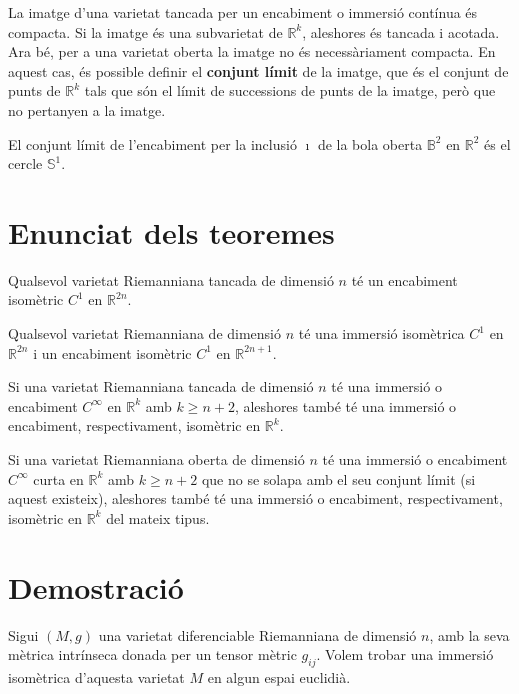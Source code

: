 La imatge d'una varietat tancada per un encabiment o immersió contínua és compacta. Si la imatge és una subvarietat de $\mathbb R^k$, aleshores és tancada i acotada. Ara bé, per a una varietat oberta la imatge no és necessàriament compacta. En aquest cas, és possible definir el \textbf{conjunt límit} de la imatge, que és el conjunt de punts de $\mathbb R^k$ tals que són el límit de successions de punts de la imatge, però que no pertanyen a la imatge. 

\begin{ex}
    El conjunt límit de l'encabiment per la inclusió $\imath$ de la bola oberta $\mathbb B^2$ en $\mathbb R^2$ és el cercle $\mathbb S^1$.
\end{ex}

\section{Enunciat dels teoremes}

\begin{teo}
    Qualsevol varietat Riemanniana tancada de dimensió $n$ té un encabiment isomètric $C^1$ en $\mathbb R^{2n}$.
\end{teo}
\begin{teo}
    Qualsevol varietat Riemanniana de dimensió $n$ té una immersió isomètrica $C^1$ en $\mathbb R^{2n}$ i un encabiment isomètric $C^1$ en $\mathbb R^{2n+1}$.
\end{teo}
\begin{teo}
    Si una varietat Riemanniana tancada de dimensió $n$ té una immersió o encabiment $C^\infty$ en $\mathbb R^{k}$ amb $k\ge n+2$, aleshores també té una immersió o encabiment, respectivament, isomètric en $\mathbb R^{k}$.
\end{teo}
\begin{teo}
    Si una varietat Riemanniana oberta de dimensió $n$ té una immersió o encabiment $C^\infty$ curta en $\mathbb R^{k}$ amb $k\ge n+2$ que no se solapa amb el seu conjunt límit (si aquest existeix), aleshores també té una immersió o encabiment, respectivament, isomètric en $\mathbb R^{k}$ del mateix tipus.
\end{teo}
\section{Demostració}
Sigui $(M,g)$ una varietat diferenciable Riemanniana de dimensió $n$, amb la seva mètrica intrínseca donada per un tensor mètric $g_{ij}$. Volem trobar una immersió isomètrica d'aquesta varietat $M$ en algun espai euclidià.


